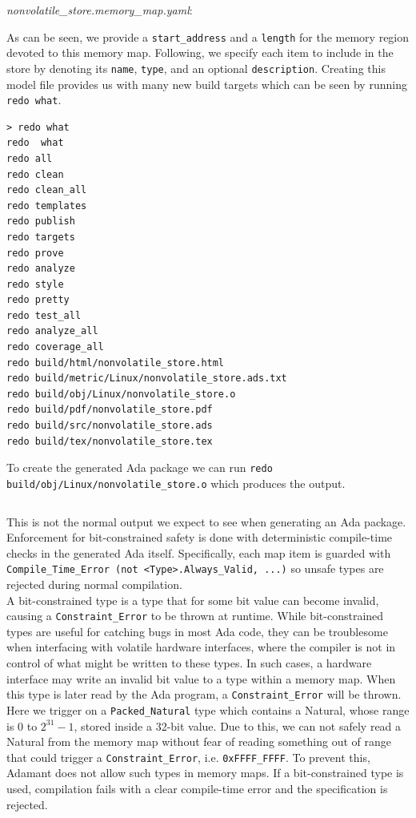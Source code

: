 \textit{nonvolatile\_store.memory\_map.yaml}:

As can be seen, we provide a \texttt{start\_address} and a \texttt{length} for the memory region devoted to this memory map. Following, we specify each item to include in the store by denoting its \texttt{name}, \texttt{type}, and an optional \texttt{description}. Creating this model file provides us with many new build targets which can be seen by running \texttt{redo what}.

\vspace{5mm} %
\begin{verbatim}
> redo what
redo  what
redo all
redo clean
redo clean_all
redo templates
redo publish
redo targets
redo prove
redo analyze
redo style
redo pretty
redo test_all
redo analyze_all
redo coverage_all
redo build/html/nonvolatile_store.html
redo build/metric/Linux/nonvolatile_store.ads.txt
redo build/obj/Linux/nonvolatile_store.o
redo build/pdf/nonvolatile_store.pdf
redo build/src/nonvolatile_store.ads
redo build/tex/nonvolatile_store.tex
\end{verbatim}
\vspace{5mm} %

To create the generated Ada package we can run \texttt{redo build/obj/Linux/nonvolatile_store.o} which produces the output.

\vspace{5mm} %
\inputminted{text}{../example_architecture/memory_map/output.txt}
\vspace{5mm} %

This is not the normal output we expect to see when generating an Ada package. Enforcement for bit-constrained safety is done with deterministic compile-time checks in the generated Ada itself. Specifically, each map item is guarded with \texttt{Compile\_Time\_Error (not <Type>.Always\_Valid, ...)} so unsafe types are rejected during normal compilation. \\

A bit-constrained type is a type that for some bit value can become invalid, causing a \texttt{Constraint\_Error} to be thrown at runtime. While bit-constrained types are useful for catching bugs in most Ada code, they can be troublesome when interfacing with volatile hardware interfaces, where the compiler is not in control of what might be written to these types. In such cases, a hardware interface may write an invalid bit value to a type within a memory map. When this type is later read by the Ada program, a \texttt{Constraint\_Error} will be thrown. Here we trigger on a \texttt{Packed\_Natural} type which contains a Natural, whose range is $0$ to $2^{31} - 1$, stored inside a 32-bit value. Due to this, we can not safely read a Natural from the memory map without fear of reading something out of range that could trigger a \texttt{Constraint_Error}, i.e. \texttt{0xFFFF_FFFF}. To prevent this, Adamant does not allow such types in memory maps. If a bit-constrained type is used, compilation fails with a clear compile-time error and the specification is rejected. \\

